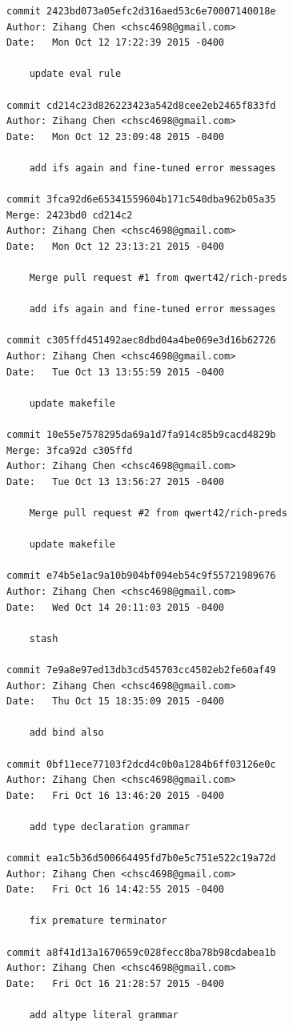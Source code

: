 \documentclass{report}
\begin{document}
\begin{appendices}
\begin{verbatim}
commit 2423bd073a05efc2d316aed53c6e70007140018e
Author: Zihang Chen <chsc4698@gmail.com>
Date:   Mon Oct 12 17:22:39 2015 -0400

    update eval rule

commit cd214c23d826223423a542d8cee2eb2465f833fd
Author: Zihang Chen <chsc4698@gmail.com>
Date:   Mon Oct 12 23:09:48 2015 -0400

    add ifs again and fine-tuned error messages

commit 3fca92d6e65341559604b171c540dba962b05a35
Merge: 2423bd0 cd214c2
Author: Zihang Chen <chsc4698@gmail.com>
Date:   Mon Oct 12 23:13:21 2015 -0400

    Merge pull request #1 from qwert42/rich-preds
    
    add ifs again and fine-tuned error messages

commit c305ffd451492aec8dbd04a4be069e3d16b62726
Author: Zihang Chen <chsc4698@gmail.com>
Date:   Tue Oct 13 13:55:59 2015 -0400

    update makefile

commit 10e55e7578295da69a1d7fa914c85b9cacd4829b
Merge: 3fca92d c305ffd
Author: Zihang Chen <chsc4698@gmail.com>
Date:   Tue Oct 13 13:56:27 2015 -0400

    Merge pull request #2 from qwert42/rich-preds
    
    update makefile

commit e74b5e1ac9a10b904bf094eb54c9f55721989676
Author: Zihang Chen <chsc4698@gmail.com>
Date:   Wed Oct 14 20:11:03 2015 -0400

    stash

commit 7e9a8e97ed13db3cd545703cc4502eb2fe60af49
Author: Zihang Chen <chsc4698@gmail.com>
Date:   Thu Oct 15 18:35:09 2015 -0400

    add bind also

commit 0bf11ece77103f2dcd4c0b0a1284b6ff03126e0c
Author: Zihang Chen <chsc4698@gmail.com>
Date:   Fri Oct 16 13:46:20 2015 -0400

    add type declaration grammar

commit ea1c5b36d500664495fd7b0e5c751e522c19a72d
Author: Zihang Chen <chsc4698@gmail.com>
Date:   Fri Oct 16 14:42:55 2015 -0400

    fix premature terminator

commit a8f41d13a1670659c028fecc8ba78b98cdabea1b
Author: Zihang Chen <chsc4698@gmail.com>
Date:   Fri Oct 16 21:28:57 2015 -0400

    add altype literal grammar


\end{verbatim}
\end{appendices}
\end{document}
